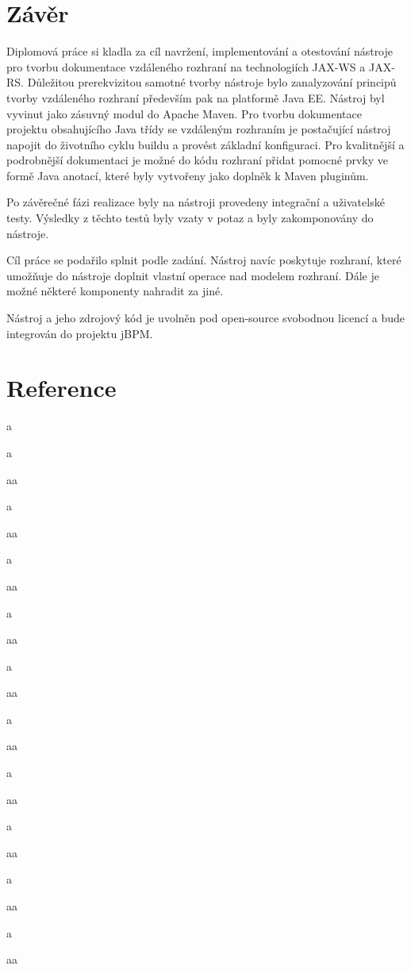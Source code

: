 \documentclass[11pt,twoside,a4paper]{book}
\begin{document}
\chapter{Závěr}

Diplomová práce si kladla za cíl navržení, implementování a otestování nástroje pro tvorbu
dokumentace vzdáleného rozhraní na technologiích JAX-WS a JAX-RS. Důležitou
prerekvizitou samotné tvorby nástroje bylo zanalyzování principů tvorby vzdáleného rozhraní
především pak na platformě Java EE. Nástroj byl vyvinut jako zásuvný modul do Apache
Maven. Pro tvorbu dokumentace projektu obsahujícího Java třídy se vzdáleným rozhraním je
postačující nástroj napojit do životního cyklu buildu a provést základní konfiguraci. Pro
kvalitnější a podrobnější dokumentaci je možné do kódu rozhraní přidat pomocné prvky ve
formě Java anotací, které byly vytvořeny jako doplněk k Maven pluginům.

Po závěrečné fázi realizace byly na nástroji provedeny integrační a uživatelské testy.
Výsledky z těchto testů byly vzaty v potaz a byly zakomponovány do nástroje.

Cíl práce se podařilo splnit podle zadání. Nástroj navíc poskytuje rozhraní, které umožňuje do
nástroje doplnit vlastní operace nad modelem rozhraní. Dále je možné některé komponenty
nahradit za jiné.

Nástroj a jeho zdrojový kód je uvolněn pod open-source svobodnou licencí a bude integrován
do projektu jBPM.

\chapter{Reference}
a

a

aa

a

aa

a

aa

a

aa

a

aa

a

aa

a

aa

a

aa

a

aa

a 

aa
\end{document}
